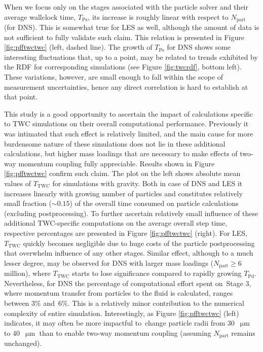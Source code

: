 \documentclass{pracamgren}
\begin{document}
When we focus only on the stages associated with the particle solver and their average wallclock time, $T_{\text{Ps}}$, its increase is roughly linear with respect to $N_{\text{part}}$ (for DNS).
This is somewhat true for LES as well, although the amount of data is not sufficient to fully validate such claim.
This relation is presented in Figure \ref{fig:pfftwctwc} (left, dashed line).
The growth of $T_{\text{Ps}}$ for DNS shows some interesting fluctuations that, up to a point, may be related to trends exhibited by the RDF for corresponding simulations (see Figure \ref{fig:twcrdf}, bottom left).
These variations, however, are small enough to fall within the scope of measurement uncertainties, hence any direct correlation is hard to establish at that point.

This study is a good opportunity to ascertain the impact of calculations specific to TWC simulations on their overall computational performance.
Previously it was intimated that such effect is relatively limited, and the main cause for more burdensome nature of these simulations does not lie in these additional calculations, but higher mass loadings that are necessary to make effects of two-way momentum coupling fully appreciable.
Results shown in Figure \ref{fig:pfftwctwc} confirm such claim.
The plot on the left shows absolute mean values of $T_{\text{TWC}}$ for simulations with gravity.
Both in case of DNS and LES it increases linearly with growing number of particles and constitutes relatively small fraction ($\sim 0.15$) of the overall time consumed on particle calculations (excluding postprocessing).
To further ascertain relatively small influence of these additional TWC-specific computations on the average overall step time, respective percentages are presented in Figure \ref{fig:pfftwctwc} (right).
For LES, $T_{\text{TWC}}$ quickly becomes negligible due to huge costs of the particle postprocessing that overwhelm influence of any other stages.
Similar effect, although to a much lesser degree, may be observed for DNS with larger mass loadings ($N_{\text{part}} \ge 6$ million), where $T_{\text{TWC}}$ starts to lose significance compared to rapidly growing $T_{\text{Pd}}$.
Nevertheless, for DNS the percentage of computational effort spent on~Stage 3, where momentum transfer from particles to the fluid is calculated, ranges between $3 \%$ and~$6 \%$.
This is a relatively minor contribution to the numerical complexity of entire simulation.
Interestingly, as Figure \ref{fig:pfftwctwc} (left) indicates, it may often be more impactful to~change particle radii from $30$~$\upmu\text{m}$ to $40$~$\upmu\text{m}$ than to enable two-way momentum coupling (assuming $N_{\text{part}}$ remains unchanged).
\end{document}
